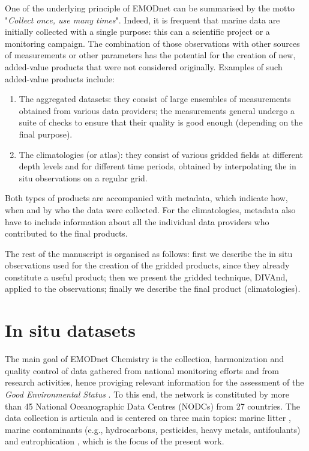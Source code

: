 \documentclass[essd, manuscript]{copernicus}
\begin{document}
One of the underlying principle of EMODnet can be summarised by the motto "\textit{Collect once, use many times}". Indeed, it is frequent that marine data are initially collected with a single purpose: this can a scientific project or a monitoring campaign. The combination of those observations with other sources of measurements or other parameters has the potential for the creation of new, added-value products that were not considered originally. Examples of such added-value products include:
\begin{enumerate}
\item The aggregated datasets: they consist of large ensembles of measurements obtained from various data providers; the measurements general undergo a suite of checks to ensure that their quality is good enough (depending on the final purpose).
\item The climatologies (or atlas): they consist of various gridded fields at different depth levels and for different time periods, obtained by interpolating the in situ observations on a regular grid.
\end{enumerate}

Both types of products are accompanied with metadata, which indicate how, when and by who the data were collected. For the climatologies, metadata also have to include information about all the individual data providers who contributed to the final products. 

The rest of the manuscript is organised as follows: first we describe the in situ observations used for the creation of the gridded products, since they already constitute a useful product; then we present the gridded technique, DIVAnd, applied to the observations; finally we describe the final product (climatologies). 


\section{In situ datasets\label{sec:insitu}}

The main goal of EMODnet Chemistry is the collection, harmonization and quality control of data gathered from national monitoring efforts and from research activities, hence proviging relevant information for the assessment of the \textit{Good Environmental Status} \citep[GES,][]{Vinci2017}. To this end, the network is constituted by more than 45 National Oceanographic Data Centres (NODCs) from 27 countries. The data collection is articula  and is centered on three main topics: marine litter \citep{Vinci2018}, marine contaminants (e.g., hydrocarbons, pesticides, heavy metals, antifoulants) and eutrophication \citep{Giorgetti2020}, which is the focus of the present work. 
\end{document}
